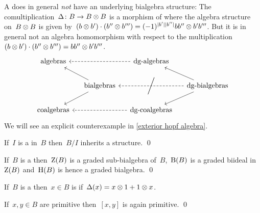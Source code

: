 \documentclass[a4paper,10pt,headings=standardclasses]{scrartcl}
\begin{document}
\begin{warning}
  A {\dgb} does in general \emph{not} have an underlying bialgebra structure:
  The comultiplication~$\Delta \colon B \to B \otimes B$ is a morphism of {\dgas} where the algebra structure on~$B \otimes B$ is given by~$(b \otimes b') \cdot (b'' \otimes b''') = (-1)^{\lvert b'\rvert \lvert b''\rvert} b b'' \otimes b' b'''$.
  But it is in general not an algebra homomorphism with respect to the multiplication~$(b \otimes b') \cdot (b'' \otimes b''') = b b'' \otimes b' b'''$.
  \[
    \begin{tikzcd}[column sep = small]
      \text{algebras}
      &
      {}
      &
      \text{\dgas}
      \arrow[dashed]{ll}
      &
      {}
      \\
      {}
      &
      \text{bialgebras}
      \arrow{ul}
      \arrow{dl}
      &
      {}
      &
      \text{\dgbs}
      \arrow{ul}
      \arrow[dashed]{ll}[{anchor=center,sloped}]{\bigg/}
      \arrow{dl}
      \\
      \text{coalgebras}
      &
      {}
      &
      \text{\dgcs}
      \arrow[dashed]{ll}
      &
      {}
    \end{tikzcd}
  \]
  We will see an explicit counterexample in \cref{exterior hopf algebra}.
\end{warning}


\begin{lemma}
  If~$I$ is a {\dgbi} in~$B$ then~$B/I$ inherits a {\dgb} structure.
  \qed
\end{lemma}

\begin{proposition}
  If~$B$ is a {\dgb} then~$\operatorname{Z}(B)$ is a graded sub-bialgebra of~$B$,~$\operatorname{B}(B)$ is a graded biideal in~$\operatorname{Z}(B)$ and~$\operatorname{H}(B)$ is hence a graded bialgebra.
  \qed
\end{proposition}

\begin{definition}
  If~$B$ is a {\dgb} then~$x \in B$ is  if~$\Delta(x) = x \otimes 1 + 1 \otimes x$.
\end{definition}

\begin{lemma}
  If~$x, y \in B$ are primitive then~$[x,y]$ is again primitive.
  \qed
\end{lemma}
\end{document}
